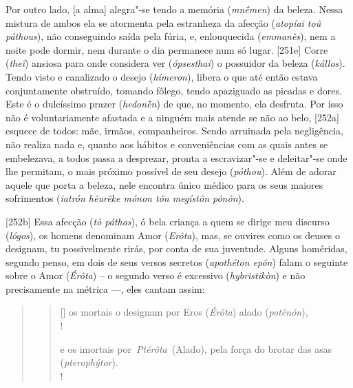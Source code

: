 Por outro lado, [a alma] alegra"-se tendo a memória (\emph{mnḗmen})
da beleza. Nessa mistura de ambos ela se atormenta pela estranheza da
afecção (\emph{atopíai toû páthous}), não conseguindo saída pela fúria,
e, enlouquecida (\emph{emmanès}), nem a noite pode dormir, nem durante o
dia permanece num só lugar. [251e] Corre (\emph{theî}) ansiosa para
onde considera ver (\emph{ópsesthai}) o possuidor da beleza
(\emph{kállos}). Tendo visto e canalizado o desejo (\emph{hímeron}),
libera o que até então estava conjuntamente obstruído, tomando fôlego,
tendo apaziguado as picadas e dores. Este é o dulcíssimo prazer
(\emph{hedonḕn}) de que, no momento, ela desfruta. Por isso não é
voluntariamente afastada e a ninguém mais atende se não ao belo,
[252a] esquece de todos: mãe, irmãos, companheiros. Sendo arruinada
pela negligência, não realiza nada e, quanto aos hábitos e conveniências
com as quais antes se embelezava, a todos passa a desprezar, pronta a
escravizar"-se e deleitar"-se onde lhe permitam, o mais próximo possível
de seu desejo (\emph{póthou}). Além de adorar aquele que porta a beleza,
nele encontra único médico para os seus maiores sofrimentos
(\emph{iatrón hêurêke mónon tôn megístôn pónôn}).

[252b] Essa afecção (\emph{tò páthos}), ó bela criança a quem se
dirige meu discurso (\emph{lógos}), os homens denominam Amor
(\emph{Erôta}), mas, se ouvires como os deuses o designam, tu
possivelmente rirás, por conta de sua juventude. Alguns homéridas,
segundo penso, em dois de seus versos secretos (\emph{apothéton epôn})
falam o seguinte sobre o Amor (\emph{Érôta}) -- o segundo verso é
excessivo (\emph{hybristikòn}) e não precisamente na métrica \mbox{---,} eles
cantam assim:

\begin{quote}
 


\begin{verse}[\versewidth]
os mortais o designam por Eros (\emph{Érôta}) alado (\emph{potênón}),\\!

e os imortais por\emph{~Ptérôta}~(Alado), pela força do brotar das asas
(\emph{pterophýtor}).\\!
\end{verse} 
\end{quote}

 

